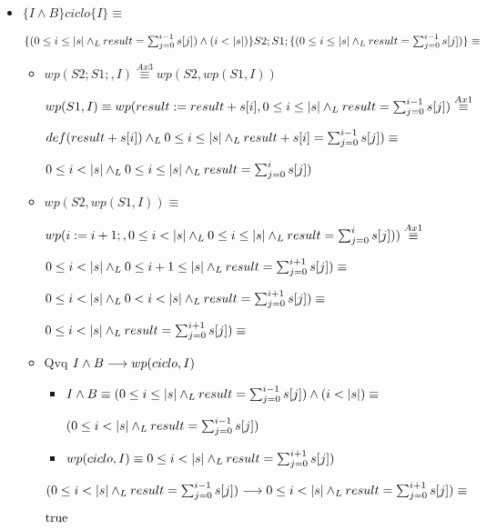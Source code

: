 \documentclass{article}
\begin{document}
\begin{itemize}
    \item $\{I \wedge B\} ciclo \{ I \} \equiv $

    $\{(0 \leq i \leq |s| \land _L result = \sum_{j=0}^{i-1} s[j]) \wedge (i < |s|)\} 
    S2;S1;
    \{(0 \leq i \leq |s| \land _L result = \sum_{j=0}^{i-1} s[j])\} \equiv$

    \begin{itemize}
        \item $wp(S2;S1;, I) \stackrel{Ax3}{\equiv} wp(S2, wp(S1, I))$
        
        $wp(S1, I) \equiv wp(result := result + s[i], 0 \leq i \leq |s| \land _L result = \sum_{j=0}^{i-1} s[j]) \stackrel{Ax1}{\equiv}$
        
        $def(result + s[i]) \land _L 0 \leq i \leq |s| \land _L result + s[i]= \sum_{j=0}^{i-1} s[j]) \equiv$

        $ 0 \leq i < |s| \land _L 0 \leq i \leq |s| \land _L result = \sum_{j=0}^{i} s[j]) $
    \end{itemize}

    \begin{itemize}
        \item $wp(S2,wp(S1, I)) \equiv$
        
        $wp(i := i + 1;, 0 \leq i < |s| \land _L 0 \leq i \leq |s| \land _L result = \sum_{j=0}^{i} s[j])) \stackrel{Ax1}{\equiv}$
        
        $0 \leq i < |s| \land _L 0 \leq i + 1 \leq |s| \land _L result = \sum_{j=0}^{i+1} s[j]) \equiv$

        $0 \leq i < |s| \land _L 0 < i < |s| \land _L result = \sum_{j=0}^{i+1} s[j]) \equiv$

        $0 \leq i < |s| \land _L result = \sum_{j=0}^{i+1} s[j]) \equiv$
    \end{itemize}

    \begin{itemize}
        \item Qvq $I \wedge B \longrightarrow wp(ciclo, I)$
        \begin{itemize}
            \item $I \wedge B \equiv (0 \leq i \leq |s| \land _L result = \sum_{j=0}^{i-1} s[j]) \wedge (i < |s|) \equiv$
            
            $(0 \leq i < |s| \land _L result = \sum_{j=0}^{i-1} s[j])$

            \item $wp(ciclo, I) \equiv 0 \leq i < |s| \land _L result = \sum_{j=0}^{i+1} s[j])$

        \end{itemize}

        $(0 \leq i < |s| \land _L result = \sum_{j=0}^{i-1} s[j]) \longrightarrow
            0 \leq i < |s| \land _L result = \sum_{j=0}^{i+1} s[j]) \equiv$

        $\mathrm{true}$


    \end{itemize}

\end{itemize}
\end{document}
